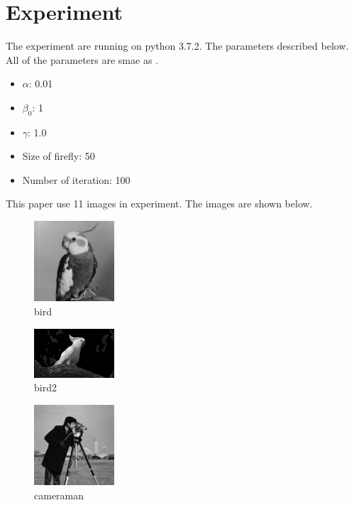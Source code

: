 \documentclass[conference]{IEEEtran}
\begin{document}
\section{Experiment}

The experiment are running on python 3.7.2. The parameters described below. All of the parameters are smae as \cite{b1}.
\begin{itemize}
    \item $\alpha$: 0.01
    \item $\beta_0$: 1
    \item $\gamma$: 1.0
    \item Size of firefly: 50
    \item Number of iteration: 100
\end{itemize}

This paper use 11 images in experiment. The images are shown below.

\begin{figure}[H]
    \centerline{\includegraphics[width=3cm]{picture/bird.png}}
    \caption{bird}
    \label{bird}
\end{figure}

\begin{figure}[H]
    \centerline{\includegraphics[width=3cm]{picture/bird2.png}}
    \caption{bird2}
    \label{bird2}
\end{figure}

\begin{figure}[H]
    \centerline{\includegraphics[width=3cm]{picture/cameraman.png}}
    \caption{cameraman}
    \label{cameraman}
\end{figure}
\end{document}
